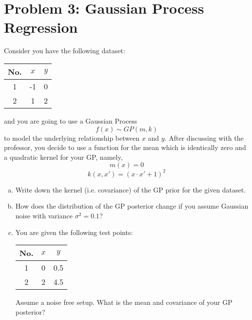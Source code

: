 \documentclass{article}
\begin{document}
\section*{Problem 3: Gaussian Process Regression} 
Consider you have the following dataset: 
\begin{table}[h]
	\centering
	\begin{tabular}{|c|c|c|}
		\hline
		No.& $x$ & $y$ \\
		\hline
		1 & -1 & 0 \\
		2 & 1 & 2 \\
		\hline
	\end{tabular}
\end{table}
\newline
and you are going to use a Gaussian Process
$$f(x) \sim GP (m, k)$$ to model the underlying relationship between $x$ and $y$. 
After discussing with the professor, you decide to use a function for the mean which is identically zero and a quadratic kernel 
for your GP, namely, 
$$m(x) = 0$$
$$k(x, x') = (x \cdot x'+1)^2$$
\begin{enumerate}[(a)]
  \item Write down the kernel (i.e. covariance) of the GP prior for the given dataset. 
  \item How does the distribution of the GP posterior change if you assume Gaussian noise with variance $\sigma^2=0.1$?
	\item You are given the following test points:
	\begin{table}[h]
		\centering
		\begin{tabular}{|c|c|c|}
			\hline
			No.& $x$ & $y$ \\
			\hline
			1 & 0 & 0.5 \\
			2 & 2 & 4.5 \\
			\hline
		\end{tabular}
	\end{table}
	\newline
	Assume a noise free setup. What is the mean and covariance of your GP posterior? 
\end{enumerate}
\end{document}
